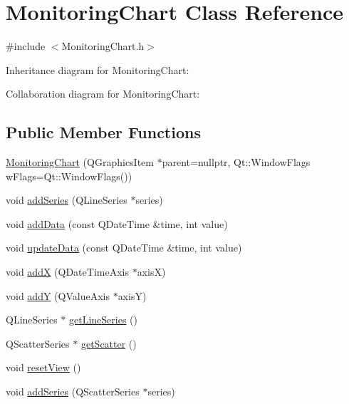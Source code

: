\hypertarget{class_monitoring_chart}{}\section{Monitoring\+Chart Class Reference}
\label{class_monitoring_chart}


{\ttfamily \#include $<$Monitoring\+Chart.\+h$>$}



Inheritance diagram for Monitoring\+Chart\+:


Collaboration diagram for Monitoring\+Chart\+:
\subsection*{Public Member Functions}
\begin{DoxyCompactItemize}
\item 
\hyperlink{class_monitoring_chart_ae630e540b605552c53c45072ce355115}{Monitoring\+Chart} (Q\+Graphics\+Item $\ast$parent=nullptr, Qt\+::\+Window\+Flags w\+Flags=Qt\+::\+Window\+Flags())
\item 
void \hyperlink{class_monitoring_chart_ab9835838b91840a4b2578be95a2f9bab}{add\+Series} (Q\+Line\+Series $\ast$series)
\item 
void \hyperlink{class_monitoring_chart_a8452696969a328012d0b6657094d7601}{add\+Data} (const Q\+Date\+Time \&time, int value)
\item 
void \hyperlink{class_monitoring_chart_a44f6764fa3f49505772384494304f980}{update\+Data} (const Q\+Date\+Time \&time, int value)
\item 
void \hyperlink{class_monitoring_chart_af038df2992a94b666f292a01a258d78c}{addX} (Q\+Date\+Time\+Axis $\ast$axisX)
\item 
void \hyperlink{class_monitoring_chart_a9247ab0e44af4bcfc0ae29156072067f}{addY} (Q\+Value\+Axis $\ast$axisY)
\item 
Q\+Line\+Series $\ast$ \hyperlink{class_monitoring_chart_a94c31083c6874962d444bb56e35699d3}{get\+Line\+Series} ()
\item 
Q\+Scatter\+Series $\ast$ \hyperlink{class_monitoring_chart_a822ff5089ce51b0382b728856ea4ba71}{get\+Scatter} ()
\item 
void \hyperlink{class_monitoring_chart_a62f4c01ba561842455b216c4ead91299}{reset\+View} ()
\item 
void \hyperlink{class_monitoring_chart_ad546d13e03b26c435c1df4c6e04bb7e4}{add\+Series} (Q\+Scatter\+Series $\ast$series)
\end{DoxyCompactItemize}


